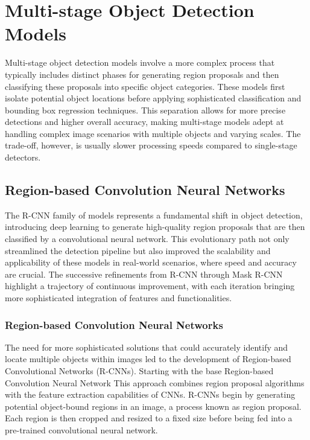 \section{Multi-stage Object Detection Models}

Multi-stage object detection models involve a more complex process that typically includes distinct phases for generating region proposals and then classifying 
these proposals into specific object categories. These models first isolate potential object locations before applying sophisticated classification and 
bounding box regression techniques. This separation allows for more precise detections and higher overall accuracy, making multi-stage models adept at 
handling complex image scenarios with multiple objects and varying scales. The trade-off, however, is usually slower processing speeds compared to 
single-stage detectors.

\subsection{Region-based Convolution Neural Networks}

The R-CNN family of models represents a fundamental shift in object detection, introducing deep learning to generate high-quality region proposals 
that are then classified by a convolutional neural network. This evolutionary path not only streamlined the detection pipeline but also improved the 
scalability and applicability of these models in real-world scenarios, where speed and accuracy are crucial. The successive refinements from R-CNN 
through Mask R-CNN highlight a trajectory of continuous improvement, with  each iteration bringing more sophisticated integration of features and functionalities.


\subsubsection{Region-based Convolution Neural Networks}

The need for more sophisticated solutions that could accurately identify and locate multiple objects within images led to the development of 
Region-based Convolutional Networks (R-CNNs). Starting with the base Region-based Convolution Neural Network This approach combines region proposal 
algorithms with the feature extraction capabilities of CNNs. R-CNNs begin by generating potential object-bound regions in an image, a process known 
as region proposal. Each region is then cropped and resized to a fixed size before being fed into a pre-trained convolutional neural network. 

